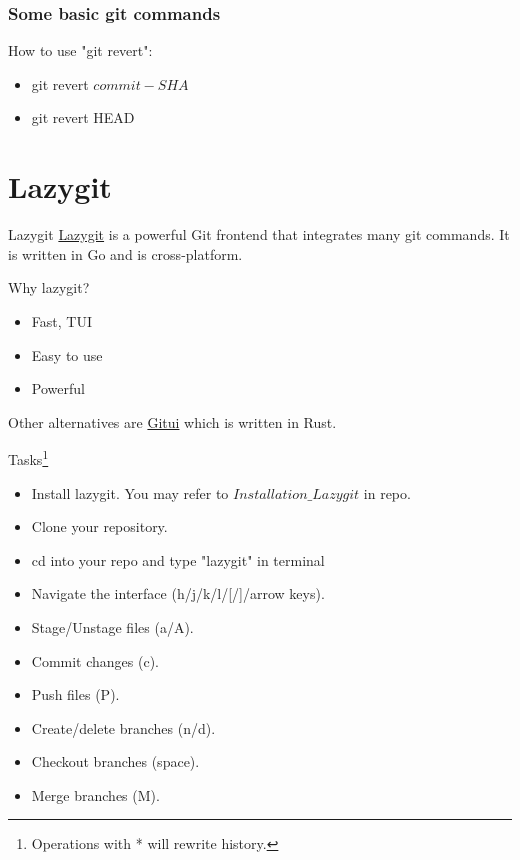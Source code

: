 \documentclass[aspectratio=169]{beamer}
\begin{document}
\begin{frame}
  \frametitle{Some basic git commands}
  How to use "git revert":
  \begin{itemize}
    \item git revert $commit-SHA$
    \item git revert HEAD
  \end{itemize}
\end{frame}

\section{Lazygit}
\begin{frame}{Lazygit}
  \href{https://github.com/jesseduffield/lazygit}{Lazygit} is a powerful Git frontend that integrates many git commands. It is written in Go and is cross-platform.

  \pause

  Why lazygit?
  \begin{itemize}
      \item Fast, TUI
      \item Easy to use
      \item Powerful
  \end{itemize}

  Other alternatives are \href{https://github.com/Extrawurst/gitui}{Gitui} which is written in Rust.
\end{frame}

\begin{frame}{Tasks\footnote{Operations with * will rewrite history.}}
          \begin{itemize}[<+->]
              \item Install lazygit. You may refer to $Installation\_Lazygit$ in repo.
              \item Clone your repository.
              \item cd into your repo and type "lazygit" in terminal
              \item Navigate the interface (h/j/k/l/[/]/arrow keys).
              \item Stage/Unstage files (a/A).
              \item Commit changes (c).
              \item Push files (P).
              \item Create/delete branches (n/d).
              \item Checkout branches (space).
              \item Merge branches (M).
          \end{itemize}
\end{frame}
\end{document}
